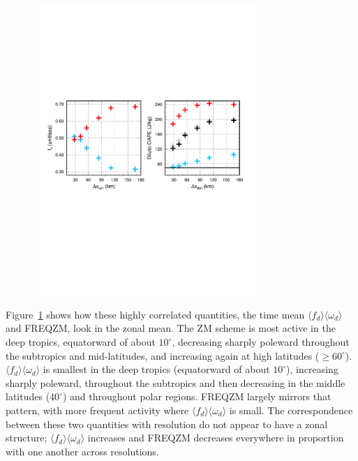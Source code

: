 {\begin{figure}[t]
\begin{center}
\noindent\includegraphics[width=20pc,angle=0]{chapter6/temp_cape.pdf}\\
\end{center}
\caption{}
\label{fig:vomg}
\end{figure}

Figure~\ref{fig:vomg} shows how these highly correlated quantities, the time mean $\langle f_{d} \rangle \langle \omega_{d} \rangle$ and FREQZM, look in the zonal mean. The ZM scheme is most active in the deep tropics, equatorward of about $10^{\circ}$, decreasing sharply poleward throughout the subtropics and mid-latitudes, and increasing again at high latitudes ($\geq 60^{\circ}$). $\langle f_{d} \rangle \langle \omega_{d} \rangle$ is smallest in the deep tropics (equatorward of about $10^{\circ}$), increasing sharply poleward, throughout the subtropics and then decreasing in the middle latitudes ($40^{\circ}$) and throughout polar regions. FREQZM largely mirrors that pattern, with more frequent activity where $\langle f_{d} \rangle \langle \omega_{d} \rangle$ is small. The correspondence between these two quantities with resolution do not appear to have a zonal structure; $\langle f_{d} \rangle \langle \omega_{d} \rangle$  increases and FREQZM decreases everywhere in proportion with one another across resolutions.

}
